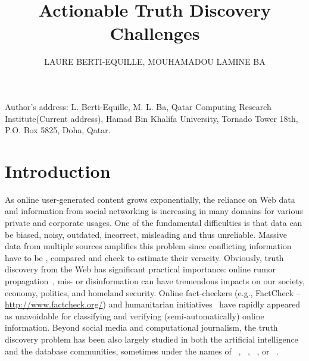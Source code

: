 \documentclass[prodmode,acmtecs]{acmsmall} %
\begin{document}
\title{Actionable Truth Discovery Challenges}
\author{LAURE BERTI-EQUILLE, MOUHAMADOU LAMINE BA
}



\begin{bottomstuff}
Author's address: L. Berti-Equille, M. L. Ba, Qatar Computing Research Institute(Current address), Hamad
Bin Khalifa University, Tornado Tower 18th, P.O. Box 5825, Doha, Qatar.
\end{bottomstuff}

\maketitle


\section{Introduction}
As online user-generated content grows exponentially,
the reliance on Web data and information from social 
networking is increasing in many domains for various private and corporate usages. 
One of the fundamental difficulties is that data can be biased, noisy, outdated, incorrect, misleading and
thus unreliable. Massive data from multiple sources amplifies this problem since conflicting information
have to be , compared  and check to estimate their veracity. Obviously, truth discovery from 
the Web has significant practical importance: online rumor propagation~\cite{rumor-icdm2013}, mis- or disinformation
can have tremendous impacts on our society, economy, politics, and homeland security. Online fact-checkers (e.g., FactCheck -- \url{http://www.factcheck.org/}) 
and humanitarian initiatives~\cite{ImranECDM13} have rapidly appeared as unavoidable for 
classifying and verifying (semi-automatically) online information. Beyond social media and computational journalism, 
the truth discovery problem has been also largely studied in both the artificial intelligence and the database communities, sometimes under the 
names of  ~\cite{GoasdoueKKLMZ13}, ~\cite{Thirunarayan2014182},
~\cite{PasternackR13}, or ~\cite{GallandAMS10}. 
\end{document}
